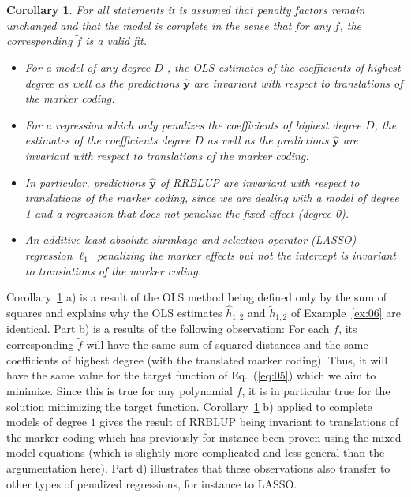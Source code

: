\documentclass{bmcart}
\newtheorem{corollary}{Corollary}
\newcommand{\0}{\mathbf{0}}
\newcommand{\y}{\mathbf{y}}
\begin{document}
\begin{corollary}\label{cor:01}
	For all statements it is assumed that penalty factors remain unchanged and that the model is complete in the sense that for any $f$, the corresponding $\tilde{f}$ is a valid fit.
	\begin{itemize}
\item [a)] 	For a model of any degree $D$ , the OLS estimates of the coefficients of highest degree as well as the predictions $\hat{\y}$ are invariant with respect to translations of the marker coding.
		\item [b)] For a regression which only penalizes the coefficients of highest degree $D$, the estimates of the coefficients degree $D$ as well as the predictions $\hat{\y}$ are invariant with respect to translations of the marker coding.
		\item[c)] 	In particular, predictions $\hat{\y}$ of RRBLUP are invariant with respect to translations of the marker coding, since we are dealing with a model of degree 1 and a regression that does not penalize the fixed effect (degree 0).
		\item[d)] An additive least absolute shrinkage and selection operator (LASSO) regression $\ell_1$~penalizing the marker effects but not the intercept is invariant to translations of the marker coding. 

	\end{itemize}
\end{corollary}
Corollary~\ref{cor:01} a) is a result of the OLS method being defined only by the sum of squares and explains why the OLS estimates $\hat{h}_{1,2}$ and $\tilde{h}_{1,2}$ of Example~\ref{ex:06} are identical. Part b) is a results of the following observation: For each $f$, its corresponding $\tilde{f}$ will have the same sum of squared distances and the same coefficients of highest degree (with the translated marker coding). Thus, it will have the same value for the target function of Eq.~(\ref{eq:05}) which we aim to minimize.
Since this is true for any polynomial $f$, it is in particular true for the solution minimizing the target function.
Corollary~\ref{cor:01} b) applied to complete models of degree $1$ gives the result of RRBLUP being invariant to translations of the marker coding which has previously for instance been proven using the mixed model equations \cite{Martini17} (which is slightly more complicated and less general than the argumentation here). Part d) illustrates that these observations also transfer to other types of penalized regressions, for instance to LASSO. 
\end{document}
